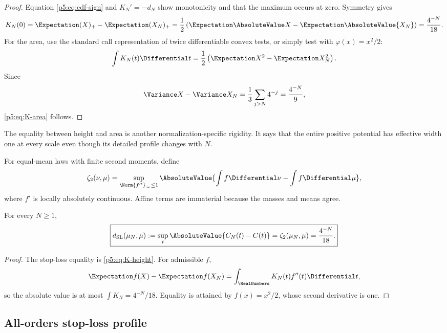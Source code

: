 \documentclass[11pt,oneside]{article}
\numberwithin{equation}{section}
\theoremstyle{definition}
\theoremstyle{remark}
\begin{document}
\begin{proof}
Equation \eqref{p5:eq:cdf-sign} and $K_N'=-d_N$ show monotonicity and that the maximum occurs at zero.  Symmetry gives
\[
 K_N(0)=\Expectation(X)_+-\Expectation(X_N)_+
 =\frac12\left(\Expectation\AbsoluteValue X-\Expectation\AbsoluteValue{X_N}\right)
 =\frac{4^{-N}}{18}.
\]
For the area, use the standard call representation of twice differentiable convex tests, or simply test with $\varphi(x)=x^2/2$:
\[
 \int K_N(t)\Differential t
 =\frac12\left(\Expectation X^2-\Expectation X_N^2\right).
\]
Since
\[
 \Variance X-\Variance X_N=\frac13\sum_{j>N}4^{-j}=\frac{4^{-N}}9,
\]
\eqref{p5:eq:K-area} follows.
\end{proof}

The equality between height and area is another normalization-specific rigidity.  It says that the entire positive potential has effective width one at every scale even though its detailed profile changes with $N$.

\begin{definition}
For equal-mean laws with finite second moments, define
\begin{equation}
 \zeta_2(\nu,\mu)=
 \sup_{\Norm{f''}_\infty\le1}
 \AbsoluteValue{\int f\Differential\nu-\int f\Differential\mu},
 \label{p5:eq:zeta2-def}
\end{equation}
where $f'$ is locally absolutely continuous.  Affine terms are immaterial because the masses and means agree.
\end{definition}

\begin{corollary}
For every $N\ge1$,
\begin{equation}
 \boxed{
 d_{\rm SL}(\mu_N,\mu):=\sup_t\AbsoluteValue{C_N(t)-C(t)}
 =\zeta_2(\mu_N,\mu)
 =\frac{4^{-N}}{18}.}
 \label{p5:eq:sl-zeta}
\end{equation}
\end{corollary}

\begin{proof}
The stop-loss equality is \eqref{p5:eq:K-height}.  For admissible $f$,
\[
 \Expectation f(X)-\Expectation f(X_N)=\int_{\RealNumbers}K_N(t)f''(t)\Differential t,
\]
so the absolute value is at most $\int K_N=4^{-N}/18$.  Equality is attained by $f(x)=x^2/2$, whose second derivative is one.
\end{proof}

\subsection{All-orders stop-loss profile}
\end{document}
